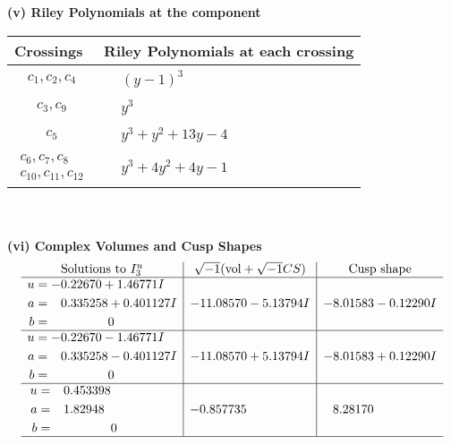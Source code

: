 \documentclass[1p]{elsarticle_modified}
\theoremstyle{definition}
\newcommand{\I}{\sqrt{-1}}
\begin{document}
\newpage\renewcommand{\arraystretch}{1}
\flushleft \textbf{(v) Riley Polynomials at the component}\newline \\
\begin{tabular}{m{50pt}|m{274pt}}
Crossings & \hspace{64pt}Riley Polynomials at each crossing \\
\hline $$\begin{aligned}c_{1},c_{2},c_{4}\end{aligned}$$&$\begin{aligned}
&(y-1)^3
\end{aligned}$\\
\hline $$\begin{aligned}c_{3},c_{9}\end{aligned}$$&$\begin{aligned}
&y^3
\end{aligned}$\\
\hline $$\begin{aligned}c_{5}\end{aligned}$$&$\begin{aligned}
&y^3+y^2+13 y-4
\end{aligned}$\\
\hline $$\begin{aligned}c_{6},c_{7},c_{8}\\c_{10},c_{11},c_{12}\end{aligned}$$&$\begin{aligned}
&y^3+4 y^2+4 y-1
\end{aligned}$\\
\hline
\end{tabular}\\~\\
\newpage\flushleft \textbf{(vi) Complex Volumes and Cusp Shapes}
$$\begin{array}{c|c|c}  
\text{Solutions to }I^u_{3}& \I (\text{vol} + \sqrt{-1}CS) & \text{Cusp shape}\\
 \hline 
\begin{aligned}
u &= -0.22670 + 1.46771 I \\
a &= \phantom{-}0.335258 + 0.401127 I \\
b &= \phantom{-0.000000 } 0\end{aligned}
 & -11.08570 - 5.13794 I & -8.01583 - 0.12290 I \\ \hline\begin{aligned}
u &= -0.22670 - 1.46771 I \\
a &= \phantom{-}0.335258 - 0.401127 I \\
b &= \phantom{-0.000000 } 0\end{aligned}
 & -11.08570 + 5.13794 I & -8.01583 + 0.12290 I \\ \hline\begin{aligned}
u &= \phantom{-}0.453398\phantom{ +0.000000I} \\
a &= \phantom{-}1.82948\phantom{ +0.000000I} \\
b &= \phantom{-0.000000 } 0\end{aligned}
 & -0.857735\phantom{ +0.000000I} & \phantom{-}8.28170\phantom{ +0.000000I}\\
 \hline 
 \end{array}$$\newpage\newpage\renewcommand{\arraystretch}{1}
\end{document}
